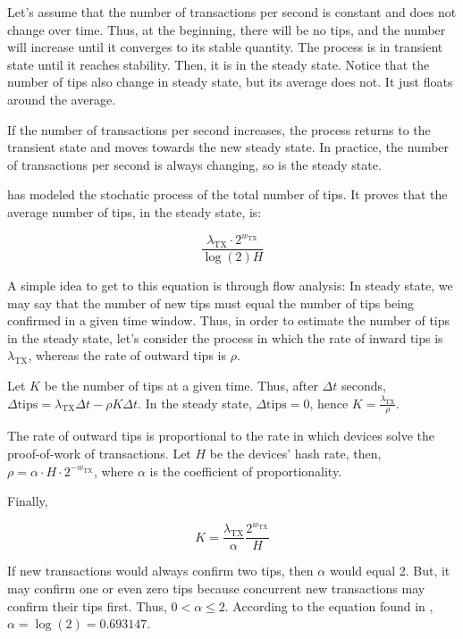 Let's assume that the number of transactions per second is constant and does not change over time. Thus, at the beginning, there will be no tips, and the number will increase until it converges to its stable quantity. The process is in transient state until it reaches stability. Then, it is in the steady state. Notice that the number of tips also change in steady state, but its average does not. It just floats around the average.

If the number of transactions per second increases, the process returns to the transient state and moves towards the new steady state. In practice, the number of transactions per second is always changing, so is the steady state.

\citet{tangle2016} has modeled the stochatic process of the total number of tips. It proves that the average number of tips, in the steady state, is:

$$\frac{\lambda_\text{TX} \cdot 2^{w_\text{TX}}}{\log(2)H}$$

A simple idea to get to this equation is through flow analysis: In steady state, we may say that the number of new tips must equal the number of tips being confirmed in a given time window. Thus, in order to estimate the number of tips in the steady state, let's consider the process in which the rate of inward tips is $\lambda_\text{TX}$, whereas the rate of outward tips is $\rho$.

Let $K$ be the number of tips at a given time. Thus, after $\Delta t$ seconds, $\Delta \text{tips} = \lambda_\text{TX} \Delta t - \rho K \Delta t$. In the steady state, $\Delta \text{tips} = 0$, hence $K = \frac{\lambda_\text{TX}}{\rho}$.

The rate of outward tips is proportional to the rate in which devices solve the proof-of-work of transactions. Let $H$ be the devices' hash rate, then, $\rho = \alpha \cdot H \cdot 2^{-w_\text{TX}}$, where $\alpha$ is the coefficient of proportionality.

Finally,

$$K = \frac{\lambda_\text{TX}}{\alpha} \frac{2^{w_\text{TX}}}{H}$$

If new transactions would always confirm two tips, then $\alpha$ would equal 2. But, it may confirm one or even zero tips because concurrent new transactions may confirm their tips first. Thus, $0 < \alpha \le 2$. According to the equation found in \citet{tangle2016}, $\alpha = \log(2) = 0.693147$.


